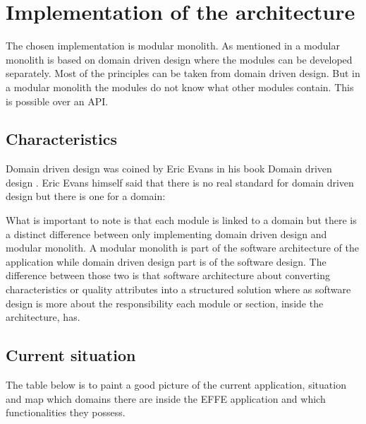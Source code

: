 \chapter{Implementation of the architecture}

The chosen implementation is modular monolith. As mentioned in  a modular monolith is based on domain driven design where the modules can be developed separately. Most of the principles can be taken from domain driven design. But in a modular monolith the modules do not know what other modules contain. This is possible over an API.

\section{Characteristics}

Domain driven design was coined by Eric Evans in his book Domain driven design \cite{domainDrivenDesign}. Eric Evans himself said that there is no real standard for domain driven design but there is one for a domain:


What is important to note is that each module is linked to a domain but there is a distinct difference between only implementing domain driven design and modular monolith. A modular monolith is part of the software architecture of the application while domain driven design part is of the software design. The difference between those two is that software architecture about converting characteristics or quality attributes into a structured solution where as software design is more about the responsibility each module or section, inside the architecture, has. \cite{softwareArchitectureDefinition}

\section{Current situation}

The table below is to paint a good picture of the current application, situation and map which domains there are inside the EFFE application and which functionalities they possess.

